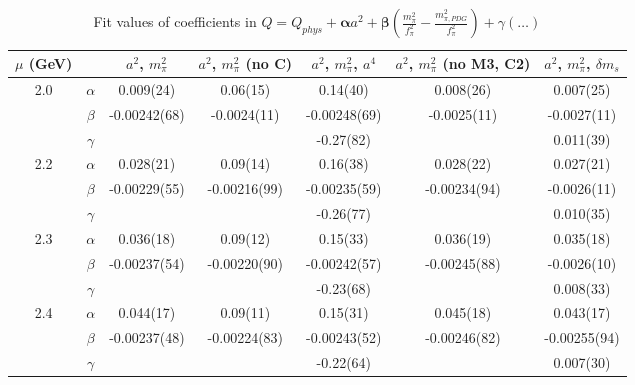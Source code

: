 \documentclass[12pt]{extarticle}
\begin{document}
\begin{table}[h!]
\begin{center}
\begin{tabular}{|c c|c|c|c|c|c|}
\hline
$\mu$ (GeV) &  & $a^2$, $m_\pi^2$& $a^2$, $m_\pi^2$ (no C)& $a^2$, $m_\pi^2$, $a^4$& $a^2$, $m_\pi^2$ (no M3, C2)& $a^2$, $m_\pi^2$, $\delta m_s$\\
\hline
\multirow{3}{0.5in}{2.0} & $\alpha$ & 0.009(24)& 0.06(15)& 0.14(40)& 0.008(26)& 0.007(25)\\
 & $\beta$ & -0.00242(68)& -0.0024(11)& -0.00248(69)& -0.0025(11)& -0.0027(11)\\
 & $\gamma$ &  &  & -0.27(82)&  & 0.011(39)\\
\hline
\multirow{3}{0.5in}{2.2} & $\alpha$ & 0.028(21)& 0.09(14)& 0.16(38)& 0.028(22)& 0.027(21)\\
 & $\beta$ & -0.00229(55)& -0.00216(99)& -0.00235(59)& -0.00234(94)& -0.0026(11)\\
 & $\gamma$ &  &  & -0.26(77)&  & 0.010(35)\\
\hline
\multirow{3}{0.5in}{2.3} & $\alpha$ & 0.036(18)& 0.09(12)& 0.15(33)& 0.036(19)& 0.035(18)\\
 & $\beta$ & -0.00237(54)& -0.00220(90)& -0.00242(57)& -0.00245(88)& -0.0026(10)\\
 & $\gamma$ &  &  & -0.23(68)&  & 0.008(33)\\
\hline
\multirow{3}{0.5in}{2.4} & $\alpha$ & 0.044(17)& 0.09(11)& 0.15(31)& 0.045(18)& 0.043(17)\\
 & $\beta$ & -0.00237(48)& -0.00224(83)& -0.00243(52)& -0.00246(82)& -0.00255(94)\\
 & $\gamma$ &  &  & -0.22(64)&  & 0.007(30)\\
\hline
\end{tabular}
\caption{Fit values of coefficients in $Q = Q_{phys} + \mathbf{\alpha} a^2 + \mathbf{\beta}\left(\frac{m_\pi^2}{f_\pi^2}-\frac{m_{\pi,PDG}^2}{f_\pi^2}\right) + \gamma(\ldots)$}
\end{center}
\end{table}




















\clearpage
\end{document}
